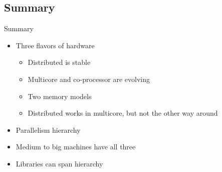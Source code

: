\subsection{Summary}
\makesubcontentsslidessec

\begin{frame}
  \begin{block}{Summary}
    \begin{itemize}
    \item Three flavors of hardware
      \begin{itemize}
      \item Distributed is stable
      \item Multicore and co-processor are evolving
      \item Two memory models
      \item Distributed works in multicore, but not the other way around
      \end{itemize}
    \item Parallelism hierarchy
    \item Medium to big machines have all three
    \item Libraries can span hierarchy
    \end{itemize}
  \end{block}
\end{frame}